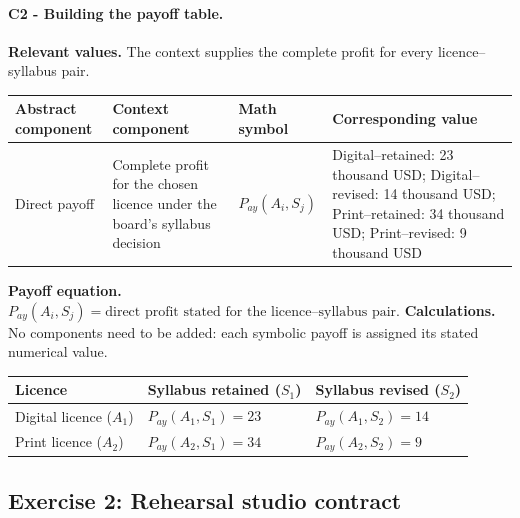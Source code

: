 \paragraph*{C2 - Building the payoff table.}
\leavevmode\par
{}
\label{subsec:problem1-textbook-publishing-rights-c2}
\textbf{Relevant values.} The context supplies the complete profit for every licence--syllabus pair.
\begin{center}
\small
\begin{tabularx}{\textwidth}{LLLL}
\toprule
Abstract component & Context component & Math symbol & Corresponding value \\
\midrule
Direct payoff & Complete profit for the chosen licence under the board's syllabus decision & $P_{ay}(A_i,S_j)$ & Digital--retained: 23 thousand USD; Digital--revised: 14 thousand USD; Print--retained: 34 thousand USD; Print--revised: 9 thousand USD \\
\bottomrule
\end{tabularx}
\end{center}
\textbf{Payoff equation.} $P_{ay}(A_i,S_j)=\text{direct profit stated for the licence--syllabus pair}$.
\textbf{Calculations.} No components need to be added: each symbolic payoff is assigned its stated numerical value.
\begin{center}
\begin{tabularx}{\textwidth}{L>{\centering\arraybackslash}X>{\centering\arraybackslash}X}
\toprule
Licence & Syllabus retained ($S_1$) & Syllabus revised ($S_2$) \\
\midrule
Digital licence ($A_1$) & $P_{ay}(A_1,S_1)=23$ & $P_{ay}(A_1,S_2)=14$ \\
Print licence ($A_2$) & $P_{ay}(A_2,S_1)=34$ & $P_{ay}(A_2,S_2)=9$ \\
\bottomrule
\end{tabularx}
\end{center}
\begingroup\renewcommand{\CalculationStateCount}{2}
\endgroup
\subsection{Exercise 2: Rehearsal studio contract}
\label{sec:problem2-rehearsal-studio-contract-c1-c2}
